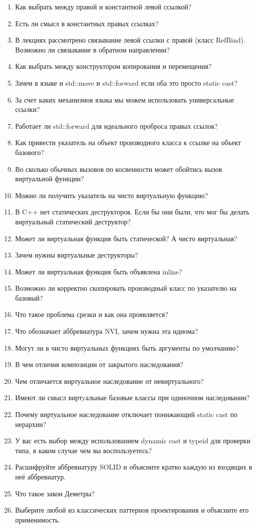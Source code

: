 \documentclass[a4paper,12pt,oneside]{book}
\begin{document}
\begin{enumerate}
\item Как выбрать между правой и константной левой ссылкой?
\item Есть ли смысл в константных правых ссылках?
\item В лекциях рассмотрено связывание левой ссылки с правой (класс RefBind). Возможно ли связывание в обратном направлении?
\item Как выбрать между конструктором копирования и перемещения?
\item Зачем в языке и std::move и std::forward если оба это просто static cast?
\item За счет каких механизмов языка мы можем использовать универсальные ссылки?
\item Работает ли std::forward для идеального проброса правых ссылок?
\item Как привести указатель на объект производного класса к ссылке на объект базового?
\item Во сколько обычных вызовов по косвенности может обойтись вызов виртуальной функции?
\item Можно ли получить указатель на чисто виртуальную функцию?
\item В C++ нет статических деструкторов. Если бы они были, что мог бы делать виртуальный статический деструктор?
\item Может ли виртуальная функция быть статической? А чисто виртуальная?
\item Зачем нужны виртуальные деструкторы?
\item Может ли виртуальная функция быть объявлена inline?
\item Возможно ли корректно скопировать производный класс по указателю на базовый?
\item Что такое проблема срезки и как она проявляется?
\item Что обозначает аббревиатура NVI, зачем нужна эта идиома?
\item Могут ли в чисто виртуальных функциях быть аргументы по умолчанию?
\item В чем отличия композиции от закрытого наследования?
\item Чем отличается виртуальное наследование от невиртуального?
\item Имеют ли смысл виртyальные базовые классы при одиночном наследовании?
\item Почему виртуальное наследование отключает понижающий static cast по иерархии?
\item У вас есть выбор между использованием dynamic cast и typeid для проверки типа, в каком случае чем вы воспользуетесь?
\item Расшифруйте аббревиатуру SOLID и объясните кратко каждую из входящих в неё аббревиатур.
\item Что такое закон Деметры?
\item Выберите любой из классических паттернов проектирования и объясните его применимость.
\end{enumerate}
\end{document}
